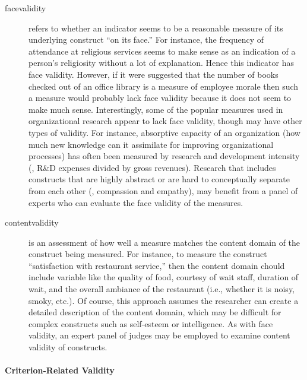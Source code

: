 \begin{description}
	\item[\Gls{facevalidity}] refers to whether an indicator seems to be a reasonable measure of its underlying construct ``on its face.'' For instance, the frequency of attendance at religious services seems to make sense as an indication of a person's religiosity without a lot of explanation. Hence this indicator has face validity. However, if it were suggested that the number of books checked out of an office library is a measure of employee morale then such a measure would probably lack face validity because it does not seem to make much sense. Interestingly, some of the popular measures used in organizational research appear to lack face validity, though may have other types of validity. For instance, absorptive capacity of an organization (how much new knowledge can it assimilate for improving organizational processes) has often been measured by research and development intensity (\ie, R\&D expenses divided by gross revenues). Research that includes constructs that are highly abstract or are hard to conceptually separate from each other (\eg, compassion and empathy), may benefit from a panel of experts who can evaluate the face validity of the measures.

	\item[\Gls{contentvalidity}] is an assessment of how well a measure matches the content domain of the construct being measured. For instance, to measure the construct ``satisfaction with restaurant service,'' then the content domain chould include variable like the quality of food, courtesy of wait staff, duration of wait, and the overall ambiance of the restaurant (i.e., whether it is noisy, smoky, etc.). Of course, this approach assumes the researcher can create a detailed description of the content domain, which may be difficult for complex constructs such as self-esteem or intelligence. As with face validity, an expert panel of judges may be employed to examine content validity of constructs.
\end{description}

\paragraph{Criterion-Related Validity}

